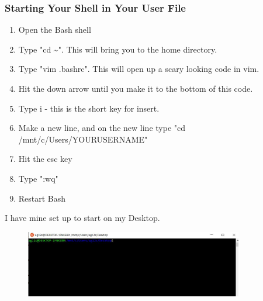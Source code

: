 \documentclass{if-beamer}
\begin{document}
\begin{frame}
\frametitle{Starting Your Shell in Your User File}

\begin{enumerate}
   \item Open the Bash shell
   \item Type "cd \textasciitilde". This will bring you to the home directory.
   \item Type "vim .bashrc". This will open up a scary looking code in vim.
   \item Hit the down arrow until you make it to the bottom of this code.
   \item Type i - this is the short key for insert.
   \item Make a new line, and on the new line type "cd /mnt/c/Users/YOURUSERNAME"
   \item Hit the esc key
   \item Type ":wq"
   \item Restart Bash 
\end{enumerate}
I have mine set up to start on my Desktop. 
\begin{figure}
	\centering
	\includegraphics[width=0.85\textwidth]{figures/homeish.jpg}
\end{figure}
\end{frame}
\end{document}
